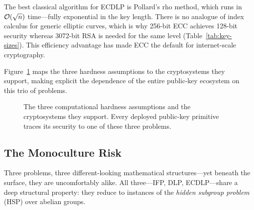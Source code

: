 The best classical algorithm for ECDLP is Pollard's rho method, which runs in $\mathcal{O}(\sqrt{n})$ time---fully exponential in the key length.  There is no analogue of index calculus for generic elliptic curves, which is why 256-bit ECC achieves 128-bit security whereas 3072-bit RSA is needed for the same level (Table~\ref{tab:key-sizes}).  This efficiency advantage has made ECC the default for internet-scale cryptography.

Figure~\ref{fig:ch03-math-security} maps the three hardness assumptions to the cryptosystems they support, making explicit the dependence of the entire public-key ecosystem on this trio of problems.

\begin{figure}[t]
\centering
{}
\caption{The three computational hardness assumptions and the cryptosystems they support.  Every deployed public-key primitive traces its security to one of these three problems.}
\label{fig:ch03-math-security}
\end{figure}

\subsection{The Monoculture Risk}
\label{subsec:monoculture}

Three problems, three different-looking mathematical structures---yet beneath the surface, they are uncomfortably alike.  All three---IFP, DLP, ECDLP---share a deep structural property: they reduce to instances of the \emph{hidden subgroup problem} (HSP) over abelian groups.

